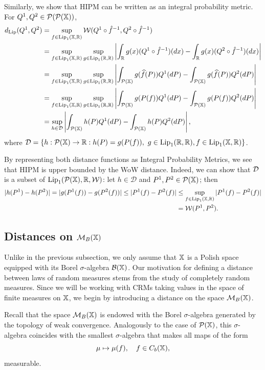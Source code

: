 Similarly, we show that HIPM can be written as an integral probability metric. For $Q^1,Q^2 \in \mathcal{P}(\mathcal{P}(\mathbb{X}))$,
\begin{align*}
d_{\mathrm{Lip}}(Q^1,Q^2) &= \sup_{f\in \mathrm{Lip}_1(\mathbb{X},\mathbb{R})} \mathcal{W}(Q^1\circ \hat{f}^{-1}, Q^2\circ \hat{f}^{-1}) \\
&= \sup_{f\in \mathrm{Lip}_1(\mathbb{X},\mathbb{R})}\sup_{g\in\mathrm{Lip}_1(\mathbb{R},\mathbb{R})}\left| \int_{\mathbb{R}}g(x) (Q^1\circ\hat{f}^{-1})(dx) - \int_{\mathbb{R}}g(x) (Q^2\circ\hat{f}^{-1})(dx) \right| \\
& = \sup_{f\in \mathrm{Lip}_1(\mathbb{X},\mathbb{R})} \sup_{g\in\mathrm{Lip}_1(\mathbb{R},\mathbb{R})}\left|\int_{\mathcal{P}(\mathbb{X})}g(\widehat{f}(P))Q^1(dP) - \int_{\mathcal{P}(\mathbb{X})}g(\widehat{f}(P))Q^2(dP) \right| \\
& = \sup_{f\in \mathrm{Lip}_1(\mathbb{X},\mathbb{R})}\sup_{g\in\mathrm{Lip}_1(\mathbb{R},\mathbb{R})}\left|\int_{\mathcal{P}(\mathbb{X})}g(P(f))Q^1(dP) - \int_{\mathcal{P}(\mathbb{X})}g(P(f))Q^2(dP) \right| \\
& = \sup_{h\in \mathcal{D}}\left|\int_{\mathcal{P}(\mathbb{X})}h(P)Q^1(dP) - \int_{\mathcal{P}(\mathbb{X})}h(P)Q^2(dP) \right|,
\end{align*}
where $\mathcal{D} = \{h:\mathcal{P}(\mathbb{X})\to \mathbb{R}: h(P) = g(P(f)), \ g\in \mathrm{Lip}_1(\mathbb{R},\mathbb{R}), f\in \mathrm{Lip}_1(\mathbb{X},\mathbb{R}) \}$.

By representing both distance functions as Integral Probability Metrics, we see that HIPM is upper bounded by the WoW distance. Indeed, we can show that $\mathcal{D}$ is a subset of $\mathrm{Lip}_1(\mathcal{P}(\mathbb{X}), \mathbb{R}, \mathcal{W})$: let $h \in \mathcal{D}$ and $P^1, P^2 \in \mathcal{P}(\mathbb{X})$; then
\begin{align*}
|h(P^1) - h(P^2)| = |g(P^1(f)) - g(P^2(f))| \leq |P^1(f) - P^2(f) | &\leq \sup_{f \in \mathrm{Lip}_1(\mathbb{X},\mathbb{R})} |P^1(f) - P^2(f) | \\
&= \mathcal{W}(P^1, P^2).
\end{align*}





\subsection{Distances on $\mathcal{M}_B(\mathbb{X})$}\label{subsection:bnp_toolbox_distances_mbx}

Unlike in the previous subsection, we only assume that $\mathbb{X}$ is a Polish space equipped with its Borel $\sigma$-algebra $\mathcal{B}(\mathbb{X})$. Our motivation for defining a distance between laws of random measures stems from the study of completely random measures. Since we will be working with CRMs taking values in the space of finite measures on $\mathbb{X}$, we begin by introducing a distance on the space $\mathcal{M}_B(\mathbb{X})$.

Recall that the space $\mathcal{M}_B(\mathbb{X})$ is endowed with the Borel $\sigma$-algebra generated by the topology of weak convergence. Analogously to the case of $\mathcal{P}(\mathbb{X})$, this $\sigma$-algebra coincides with the smallest $\sigma$-algebra that makes all maps of the form
\[
\mu \mapsto \mu(f), \quad f \in C_b(\mathbb{X}),
\]
measurable.


